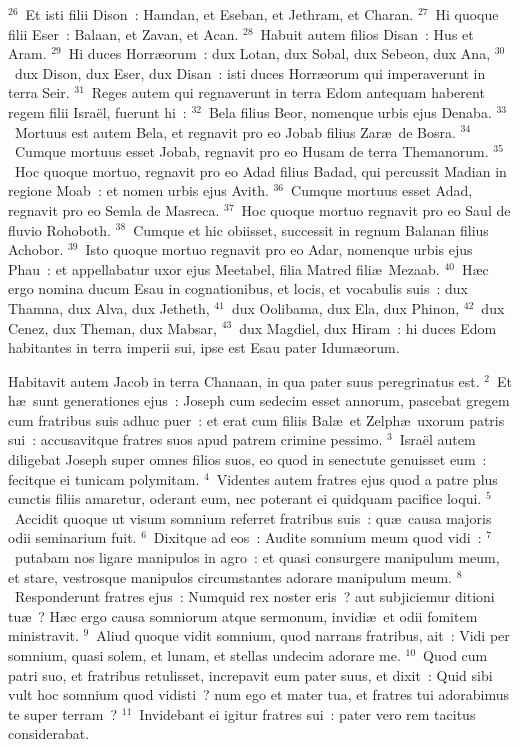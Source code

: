 ${}^{26}$~Et isti filii Dison~: Hamdan, et Eseban, et Jethram, et Charan.
${}^{27}$~Hi quoque filii Eser~: Balaan, et Zavan, et Acan.
${}^{28}$~Habuit autem filios Disan~: Hus et Aram.
${}^{29}$~Hi duces Horr\ae orum~: dux Lotan, dux Sobal, dux Sebeon, dux Ana,
${}^{30}$~dux Dison, dux Eser, dux Disan~: isti duces Horr\ae orum qui imperaverunt in terra Seir.
${}^{31}$~Reges autem qui regnaverunt in terra Edom antequam haberent regem filii Isra\"el, fuerunt hi~:
${}^{32}$~Bela filius Beor, nomenque urbis ejus Denaba.
${}^{33}$~Mortuus est autem Bela, et regnavit pro eo Jobab filius Zar\ae\ de Bosra.
${}^{34}$~Cumque mortuus esset Jobab, regnavit pro eo Husam de terra Themanorum.
${}^{35}$~Hoc quoque mortuo, regnavit pro eo Adad filius Badad, qui percussit Madian in regione Moab~: et nomen urbis ejus Avith.
${}^{36}$~Cumque mortuus esset Adad, regnavit pro eo Semla de Masreca.
${}^{37}$~Hoc quoque mortuo regnavit pro eo Saul de fluvio Rohoboth.
${}^{38}$~Cumque et hic obiisset, successit in regnum Balanan filius Achobor.
${}^{39}$~Isto quoque mortuo regnavit pro eo Adar, nomenque urbis ejus Phau~: et appellabatur uxor ejus Meetabel, filia Matred fili\ae\ Mezaab.
${}^{40}$~H\ae c ergo nomina ducum Esau in cognationibus, et locis, et vocabulis suis~: dux Thamna, dux Alva, dux Jetheth,
${}^{41}$~dux Oolibama, dux Ela, dux Phinon,
${}^{42}$~dux Cenez, dux Theman, dux Mabsar,
${}^{43}$~dux Magdiel, dux Hiram~: hi duces Edom habitantes in terra imperii sui, ipse est Esau pater Idum\ae orum.

\lettrine[lines=3,image=true,loversize=0.05,lraise=-0.03]{H}{}abitavit autem Jacob in terra Chanaan, in qua pater suus peregrinatus est.
${}^{2}$~Et h\ae\ sunt generationes ejus~: Joseph cum sedecim esset annorum, pascebat gregem cum fratribus suis adhuc puer~: et erat cum filiis Bal\ae\ et Zelph\ae\ uxorum patris sui~: accusavitque fratres suos apud patrem crimine pessimo.
${}^{3}$~Isra\"el autem diligebat Joseph super omnes filios suos, eo quod in senectute genuisset eum~: fecitque ei tunicam polymitam.
${}^{4}$~Videntes autem fratres ejus quod a patre plus cunctis filiis amaretur, oderant eum, nec poterant ei quidquam pacifice loqui.
${}^{5}$~Accidit quoque ut visum somnium referret fratribus suis~: qu\ae\ causa majoris odii seminarium fuit.
${}^{6}$~Dixitque ad eos~: Audite somnium meum quod vidi~:
${}^{7}$~putabam nos ligare manipulos in agro~: et quasi consurgere manipulum meum, et stare, vestrosque manipulos circumstantes adorare manipulum meum.
${}^{8}$~Responderunt fratres ejus~: Numquid rex noster eris~? aut subjiciemur ditioni tu\ae~? H\ae c ergo causa somniorum atque sermonum, invidi\ae\ et odii fomitem ministravit.
${}^{9}$~Aliud quoque vidit somnium, quod narrans fratribus, ait~: Vidi per somnium, quasi solem, et lunam, et stellas undecim adorare me.
${}^{10}$~Quod cum patri suo, et fratribus retulisset, increpavit eum pater suus, et dixit~: Quid sibi vult hoc somnium quod vidisti~? num ego et mater tua, et fratres tui adorabimus te super terram~?
${}^{11}$~Invidebant ei igitur fratres sui~: pater vero rem tacitus considerabat.


